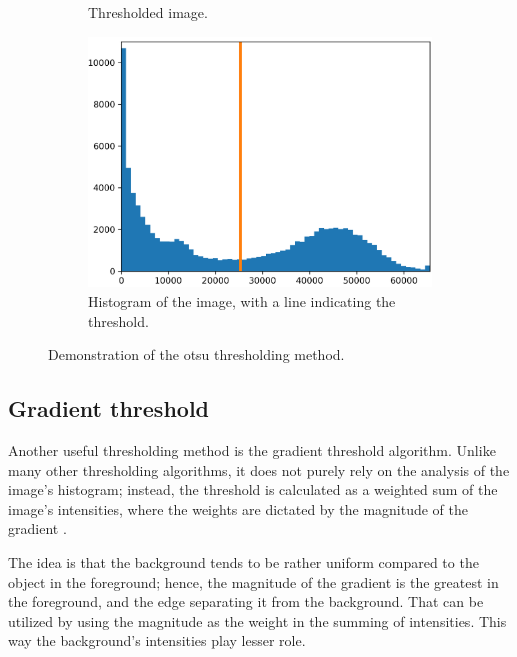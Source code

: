 \documentclass[
  digital,     %
  oneside,     %
  nosansbold,  %
  nocolorbold, %
  lof,         %
  lot,         %
]{fithesis4}
\begin{document}
\begin{figure}
\begin{subfigure}[t]{0.45\textwidth}
        \caption{Thresholded image.}
        \label{fig:otsu-thresholded}
    \end{subfigure}
    \begin{subfigure}[t]{0.6\textwidth}
        \centering
        \includegraphics[width=\textwidth]{resources/otsu-histogram.png}
        \caption{Histogram of the image, with a line indicating the threshold.}
        \label{fig:otsu-histogram}
    \end{subfigure}
    \caption{Demonstration of the otsu thresholding method.}
    \label{fig:otsu-demonstration}
\end{figure}


\subsection{Gradient threshold}

Another useful thresholding method is the gradient threshold algorithm. Unlike
many other thresholding algorithms, it does not purely rely on the analysis of
the image's histogram; instead, the threshold is calculated as a weighted sum of
the image's intensities, where the weights are dictated by the magnitude of the
gradient \cite{pb130}.

The idea is that the background tends to be rather uniform compared to the
object in the foreground; hence, the magnitude of the gradient is the greatest
in the foreground, and the edge separating it from the background. That can be
utilized by using the magnitude as the weight in the summing of intensities.
This way the background's intensities play lesser role.
\end{document}
